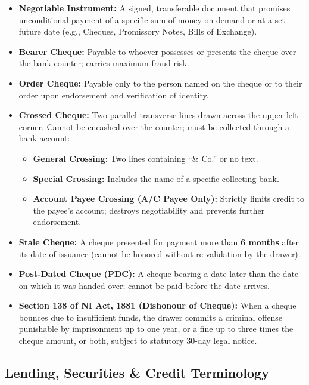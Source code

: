 \begin{itemize}
  \item \textbf{Negotiable Instrument:} A signed, transferable document that promises unconditional payment of a specific sum of money on demand or at a set future date (e.g., Cheques, Promissory Notes, Bills of Exchange).
  \item \textbf{Bearer Cheque:} Payable to whoever possesses or presents the cheque over the bank counter; carries maximum fraud risk.
  \item \textbf{Order Cheque:} Payable only to the person named on the cheque or to their order upon endorsement and verification of identity.
  \item \textbf{Crossed Cheque:} Two parallel transverse lines drawn across the upper left corner. Cannot be encashed over the counter; must be collected through a bank account:
  \begin{itemize}
    \item \textbf{General Crossing:} Two lines containing ``\& Co.'' or no text.
    \item \textbf{Special Crossing:} Includes the name of a specific collecting bank.
    \item \textbf{Account Payee Crossing (A/C Payee Only):} Strictly limits credit to the payee's account; destroys negotiability and prevents further endorsement.
  \end{itemize}
  \item \textbf{Stale Cheque:} A cheque presented for payment more than \textbf{6 months} after its date of issuance (cannot be honored without re-validation by the drawer).
  \item \textbf{Post-Dated Cheque (PDC):} A cheque bearing a date later than the date on which it was handed over; cannot be paid before the date arrives.
  \item \textbf{Section 138 of NI Act, 1881 (Dishonour of Cheque):} When a cheque bounces due to insufficient funds, the drawer commits a criminal offense punishable by imprisonment up to one year, or a fine up to three times the cheque amount, or both, subject to statutory 30-day legal notice.
\end{itemize}

\medskip

\subsection{Lending, Securities \& Credit Terminology}

